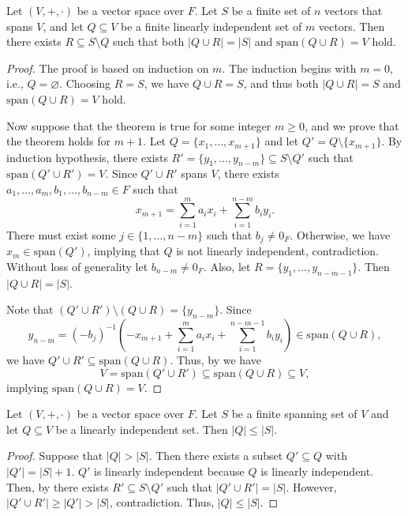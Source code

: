 \begin{theorem}\label{thm:replacement}
  Let $(V, +, \cdot)$ be a vector space over $F$.
  Let $S$ be a finite set of $n$ vectors that spans $V$,
  and let $Q \subseteq V$ be a finite linearly independent set of $m$ vectors.
  Then there exists $R \subseteq S \setminus Q$ such that
  both $|Q \cup R| = |S|$ and $\mathrm{span}(Q \cup R) = V$ hold.
\end{theorem}
\begin{proof}
  The proof is based on induction on $m$.
  The induction begins with $m = 0$, i.e., $Q = \varnothing$.
  Choosing $R = S$, we have $Q \cup R = S$, and thus
  both $|Q \cup R| = S$ and $\mathrm{span}(Q \cup R) = V$ hold.

  Now suppose that the theorem is true for some integer $m \geq 0$,
  and we prove that the theorem holds for $m + 1$.
  Let $Q = \{x_1, \dots, x_{m+1}\}$ and let $Q' = Q \setminus \{x_{m+1}\}$.
  By induction hypothesis, there exists
  $R' = \{y_1, \dots, y_{n-m}\} \subseteq S \setminus Q'$
  such that $\mathrm{span}(Q' \cup R') = V$.
  Since $Q' \cup R'$ spans $V$, there exists
  $a_1, \dots, a_m, b_1, \dots, b_{n-m} \in F$ such that
  \begin{equation*}
    x_{m+1} = \sum_{i=1}^m a_ix_i + \sum_{i=1}^{n-m} b_iy_i.
  \end{equation*}
  There must exist some $j \in \{1, \dots, n-m\}$
  such that $b_j \neq 0_F$.
  Otherwise, we have $x_m \in \mathrm{span}(Q')$, implying that $Q$ is not
  linearly independent, contradiction.
  Without loss of generality let $b_{n-m} \neq 0_F$.
  Also, let $R = \{y_1, \dots, y_{n-m-1}\}$.
  Then $|Q \cup R| = |S|$.
  
  Note that $(Q' \cup R') \setminus (Q \cup R) = \{y_{n-m}\}$.
  Since
  \begin{equation*}
    y_{n-m} = (-b_j)^{-1}\left(
      -x_{m+1} + \sum_{i=1}^m a_ix_i + \sum_{i=1}^{n-m-1} b_iy_i
    \right) \in \mathrm{span}(Q \cup R),
  \end{equation*}
  we have $Q' \cup R' \subseteq \mathrm{span}(Q \cup R)$.
  Thus, by  we have
  \begin{equation*}
    V = \mathrm{span}(Q' \cup R')
      \subseteq \mathrm{span}(Q \cup R)
      \subseteq V,
  \end{equation*}
  implying $\mathrm{span}(Q \cup R) = V$.
\end{proof}

\begin{corollary}
  Let $(V, +, \cdot)$ be a vector space over $F$.
  Let $S$ be a finite spanning set of $V$ and let $Q \subseteq V$
  be a linearly independent set.
  Then $|Q| \leq |S|$.
\end{corollary}
\begin{proof}
  Suppose that $|Q| > |S|$.
  Then there exists a subset $Q' \subseteq Q$ with $|Q'| = |S| + 1$.
  $Q'$ is linearly independent because $Q$ is linearly independent.
  Then, by  there exists $R' \subseteq S \setminus Q'$
  such that $|Q' \cup R'| = |S|$.
  However, $|Q' \cup R'| \geq |Q'| > |S|$, contradiction.
  Thus, $|Q| \leq |S|$.
\end{proof}